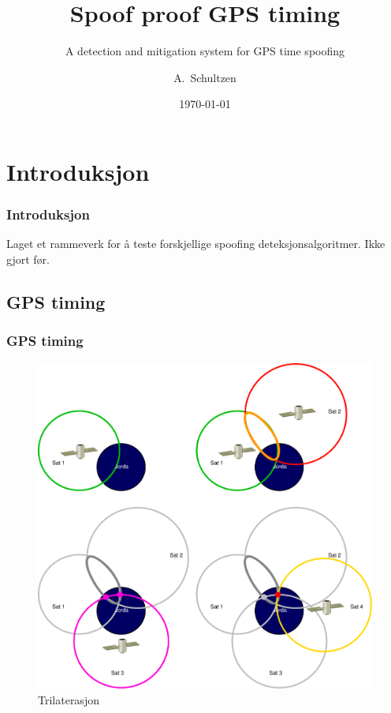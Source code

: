 \documentclass[xcolor=table]{beamer}
\title[Spoof proof GPS timing] %
{Spoof proof GPS timing}
\subtitle{A detection and mitigation system for GPS time spoofing}
\author[A. Schultzen] %
{A.~Schultzen\inst{1}}
\institute[Universities Here and There] %
{
  \inst{1}%
  Institutt for informatikk\\
  Universitetet i Oslo
}
\date{\today}
\begin{document}
\frame{\titlepage}

\section{Introduksjon}
  \frametitle{Introduksjon}
\begin{frame}
  Laget et rammeverk for å teste forskjellige spoofing deteksjonsalgoritmer. Ikke gjort før.
\end{frame}

\subsection{GPS timing}
\begin{frame}
\frametitle{GPS timing} 
  \begin{figure}
  \vspace{-30pt}
      \includegraphics[scale=0.17]{thesis/graphics/trilaterate.pdf}
      \caption{Trilaterasjon}
    \end{figure}
\end{frame}
\end{document}
